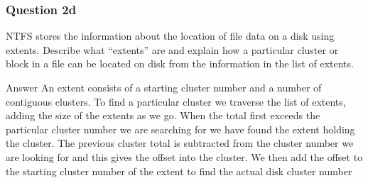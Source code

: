 \documentclass{beamer}
\begin{document}
\begin{frame}
  \frametitle{Question 2d}
  NTFS stores the information about the location of file data on a disk using extents. Describe what “extents” are and explain how a particular cluster or block in a file can be located on disk from the information in the list of extents.
  \pause
  \begin{block}{Answer}
    An extent consists of a starting cluster number and a number of contiguous clusters. To find a particular cluster we traverse the list of extents, adding the size of the extents as we go. When the total first exceeds the particular cluster number we are searching for we have found the extent holding the cluster. The previous cluster total is subtracted from the cluster number we are looking for and this gives the offset into the cluster. We then add the offset to the starting cluster number of the extent to find the actual disk cluster number
  \end{block}
\end{frame}
\end{document}
